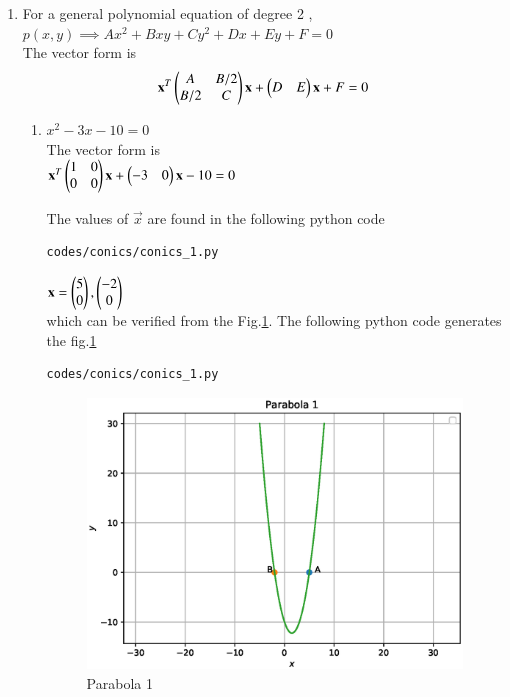 \renewcommand{\theequation}{\theenumi}
\begin{enumerate}[label=\arabic*.,ref=\thesubsection.\theenumi]
\item For a general polynomial equation of degree 2 , \\
$p(x,y) \implies Ax^2+Bxy+Cy^2+Dx+Ey+F=0$ \\
The vector form is  
\begin{equation} \label{eq:poly}
\mathbf{x}^T\begin{pmatrix}A&B/2\\B/2&C\end{pmatrix}\mathbf{x}+\begin{pmatrix}D&E\end{pmatrix}\mathbf{x}+F=0 
\end{equation}

\begin{enumerate}

\item $x^2-3x-10=0$  \\
The vector form is \\
$\mathbf{x}^T\begin{pmatrix}1&0\\0&0\end{pmatrix}\mathbf{x}+\begin{pmatrix}-3&0\end{pmatrix}\mathbf{x}-10=0$

The values of $\vec{x}$ are found in the following python code
\begin{lstlisting}
codes/conics/conics_1.py
\end{lstlisting}

$\mathbf{x}=\begin{pmatrix}5\\0\end{pmatrix}, \begin{pmatrix}-2\\0\end{pmatrix}$ \\
which can be verified from the Fig.\ref{fig:parabola_1}.
The following python code generates the fig.\ref{fig:parabola_1}
\begin{lstlisting}
codes/conics/conics_1.py
\end{lstlisting}
\begin{figure}[!ht]
\includegraphics[width=\columnwidth]{./codes/conics/conics_1.eps}
\caption{Parabola 1}
\label{fig:parabola_1}
\end{figure} 


\end{enumerate}
\end{enumerate}
